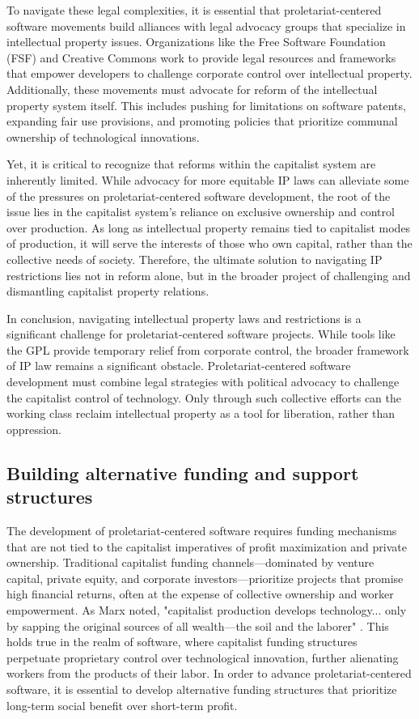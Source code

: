 \begin{refsection}
To navigate these legal complexities, it is essential that proletariat-centered software movements build alliances with legal advocacy groups that specialize in intellectual property issues. Organizations like the Free Software Foundation (FSF) and Creative Commons work to provide legal resources and frameworks that empower developers to challenge corporate control over intellectual property. Additionally, these movements must advocate for reform of the intellectual property system itself. This includes pushing for limitations on software patents, expanding fair use provisions, and promoting policies that prioritize communal ownership of technological innovations.

Yet, it is critical to recognize that reforms within the capitalist system are inherently limited. While advocacy for more equitable IP laws can alleviate some of the pressures on proletariat-centered software development, the root of the issue lies in the capitalist system's reliance on exclusive ownership and control over production. As long as intellectual property remains tied to capitalist modes of production, it will serve the interests of those who own capital, rather than the collective needs of society. Therefore, the ultimate solution to navigating IP restrictions lies not in reform alone, but in the broader project of challenging and dismantling capitalist property relations.

In conclusion, navigating intellectual property laws and restrictions is a significant challenge for proletariat-centered software projects. While tools like the GPL provide temporary relief from corporate control, the broader framework of IP law remains a significant obstacle. Proletariat-centered software development must combine legal strategies with political advocacy to challenge the capitalist control of technology. Only through such collective efforts can the working class reclaim intellectual property as a tool for liberation, rather than oppression.

\subsection{Building alternative funding and support structures}

The development of proletariat-centered software requires funding mechanisms that are not tied to the capitalist imperatives of profit maximization and private ownership. Traditional capitalist funding channels—dominated by venture capital, private equity, and corporate investors—prioritize projects that promise high financial returns, often at the expense of collective ownership and worker empowerment. As Marx noted, "capitalist production develops technology... only by sapping the original sources of all wealth—the soil and the laborer" \cite[pp.~638]{marx_capital_vol_1}. This holds true in the realm of software, where capitalist funding structures perpetuate proprietary control over technological innovation, further alienating workers from the products of their labor. In order to advance proletariat-centered software, it is essential to develop alternative funding structures that prioritize long-term social benefit over short-term profit.


\end{refsection}
